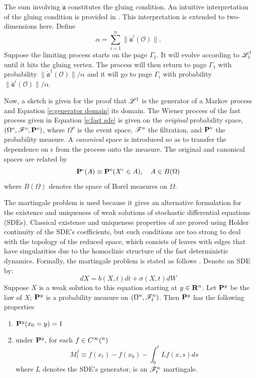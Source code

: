 The sum involving $\mathring{\mathfrak a}$ constitutes the gluing condition. An intuitive interpretation of the gluing condition is provided in \citet{namachchivaya01:_unified_approac_noisy_nonlin_mathieu_type_system}. This interpretation is extended to two-dimensions here. Define
\[
\alpha = \sum_{i=1}^n \lVert \mathring{\mathfrak a}^i(\mathcal{O}) \rVert.
\]
Suppose the limiting process starts on the page $\Gamma_1$. It will evolve according to $\mathscr L_1^\dagger$ until it hits the gluing vertex. The process will then return to page $\Gamma_1$ with probability $\lVert \mathring{\mathfrak a}^1(\mathcal{O}) \rVert/\alpha$ and it will go to page $\Gamma_i$ with probability $\lVert \mathring{\mathfrak a}^i(\mathcal{O}) \rVert/\alpha$.

Now, a sketch is given for the proof that $\mathscr L^\dagger$ is the generator of a Markov process and Equation \eqref{e:generator domain} its domain.
The Wiener process of the fast process given in Equation \eqref{e:fast sde} is given on the \emph{original} probability space, $(\Omega^o,\mathscr F^o,\mathbf P^o)$, where $\Omega^o$ is the event space, $\mathscr F^o$ the filtration, and $\mathbf P^o$ the probability measure. A \emph{canonical} space is introduced so as to transfer the dependence on $\epsilon$ from the process onto the measure. The original and canonical spaces are related by
\[
\mathbf P^\epsilon(A) \equiv \mathbf P^o(X^\epsilon \in A), \quad A \in B(\Omega)
\]
where $B(\Omega)$ denotes the space of Borel measures on $\Omega$.

The martingale problem is used because it gives an alternative formulation for the existence and uniqueness of weak solutions of stochastic differential equations (SDEs). Classical existence and uniqueness properties of are proved using Holder continuity of the SDE's coefficients, but such conditions are too strong to deal with the topology of the reduced space, which consists of leaves with edges that have singularities due to the homoclinic structure of the fast deterministic dynamics. Formally, the martingale problem is stated as follows \citep{rogers00:_diffus_markov}. Denote an SDE by:
\[
dX = b(X,t) dt + \sigma(X,t) dW
\]
Suppose $X$ is a weak solution to this equation starting at $y \in \mathbf R^n$. Let $\mathbf P^y$ be the law of $X$; $\mathbf P^y$ is a probability measure on $(\Omega^n,\mathscr F_t^n)$. Then $\mathbf P^y$ has the following properties
\begin{enumerate}
\item $\mathbf P^y(x_0 = y) = 1$
\item under $\mathbf P^y$, for each $f \in C^\infty(\real^n)$
\[
M_t^f \equiv f(x_t) - f(x_0) - \int_0^t L f(x,s) ds
\]
where $L$ denotes the SDE's generator, is an $\mathscr F_t^n$ martingale.
\end{enumerate}


